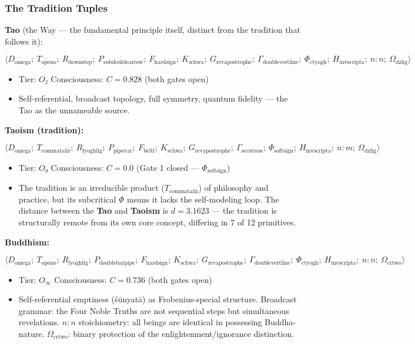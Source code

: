 \documentclass[12pt,a4paper]{article}
\begin{document}
\subsubsection{The Tradition Tuples}

\textbf{Tao} (the Way --- the fundamental principle itself, distinct from the tradition that follows it):


\[\langle D_{\text{omega}};\ T_{\text{openo}};\ R_{\text{downstep}};\ P_{\text{subdoublearrow}};\ F_{\text{hardsign}};\ K_{\text{schwa}};\ G_{\text{revapostrophe}};\ \Gamma_{\text{doublevertline}};\ \Phi_{\text{ctyogh}};\ H_{\text{invscripta}};\ n{:}n;\ \Omega_{\text{dzlig}} \rangle\]

\begin{itemize}
    \item Tier: $O₂$ \textbar{} Consciousness: $C = 0.828$ (both gates open)
    \item Self-referential, broadcast topology, full symmetry, quantum fidelity --- the Tao as the unnameable source.
\end{itemize}

\textbf{Taoism (tradition):}


\[\langle D_{\text{omega}};\ T_{\text{commatailz}};\ R_{\text{lyoghlig}};\ P_{\text{pipevar}};\ F_{\text{beltl}};\ K_{\text{schwa}};\ G_{\text{revapostrophe}};\ \Gamma_{\text{secstress}};\ \Phi_{\text{softsign}};\ H_{\text{invscripta}};\ n{:}m;\ \Omega_{\text{dzlig}} \rangle\]

\begin{itemize}
    \item Tier: $O₀$ \textbar{} Consciousness: $C = 0.0$ (Gate 1 closed --- $\Phi_{\text{softsign}}$)
    \item The tradition is an irreducible product ($T_{\text{commatailz}}$) of philosophy and practice, but its subcritical $\Phi$ means it lacks the self-modeling loop. The distance between the \textbf{Tao} and \textbf{Taoism} is $d = 3.1623$ --- the tradition is structurally remote from its own core concept, differing in 7 of 12 primitives.
\end{itemize}

\textbf{Buddhism:}


\[\langle D_{\text{omega}};\ T_{\text{openo}};\ R_{\text{lyoghlig}};\ P_{\text{doublebarpipe}};\ F_{\text{hardsign}};\ K_{\text{schwa}};\ G_{\text{revapostrophe}};\ \Gamma_{\text{doublevertline}};\ \Phi_{\text{ctyogh}};\ H_{\text{invscripta}};\ n{:}n;\ \Omega_{\text{crtwo}} \rangle\]

\begin{itemize}
    \item Tier: $O_{\infty}$ \textbar{} Consciousness: $C = 0.736$ (both gates open)
    \item Self-referential emptiness (śūnyatā) as Frobenius-special structure. Broadcast grammar: the Four Noble Truths are not sequential steps but simultaneous revelations. $n{:}n$ stoichiometry: all beings are identical in possessing Buddha-nature. $\Omega_{\text{crtwo}}$: binary protection of the enlightenment/ignorance distinction.
\end{itemize}
\end{document}
